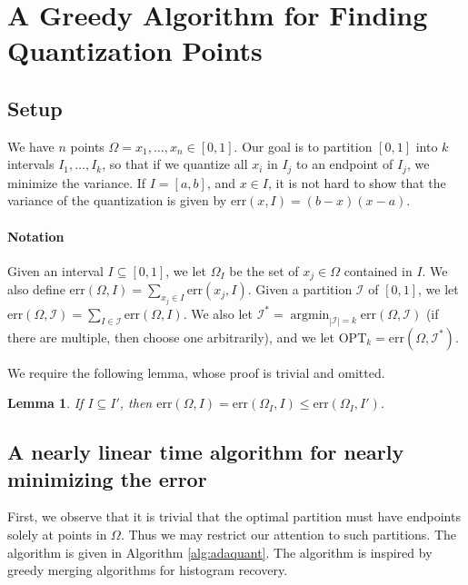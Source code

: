 \documentclass{article}
\newcommand{\err}{\ensuremath{\mathrm{err}}}
\newcommand{\setX}{\Omega}
\newcommand{\setI}{\mathcal{I}}
\newcommand{\OPT}{\ensuremath{\mathrm{OPT}}}
\DeclareMathOperator*{\argmin}{argmin}
\newtheorem{lemma}{Lemma}
\begin{document}
\section{A Greedy Algorithm for Finding Quantization Points}
\subsection{Setup}
We have $n$ points $\setX = x_1, \ldots, x_n \in [0, 1]$.
Our goal is to partition $[0, 1]$ into $k$ intervals $I_1, \ldots, I_k$, so that if we quantize all $x_i$ in $I_j$ to an endpoint of $I_j$, we minimize the variance.
If $I = [a, b]$, and $x \in I$, it is not hard to show that the variance of the quantization is given by $\err (x, I) = (b - x) (x - a)$.

\paragraph{Notation} Given an interval $I \subseteq [0, 1]$, we let $\setX_I$ be the set of $x_j \in \setX$ contained in $I$.
We also define $\err (\setX, I) = \sum_{x_j \in I} \err (x_j, I)$.
Given a partition $\setI$ of $[0, 1]$, we let $\err (\setX, \setI) = \sum_{I \in \setI} \err (\setX, I)$.
We also let $\setI^* = \argmin_{|\setI| = k} \err (\setX, \setI)$ (if there are multiple, then choose one arbitrarily), and we let $\OPT_k = \err(\setX, \setI^*)$.

We require the following lemma, whose proof is trivial and omitted.
\begin{lemma}
\label{lem:subset}
If $I \subseteq I'$, then $\err(\setX, I) = \err (\setX_I, I) \leq \err (\setX_I, I')$.
\end{lemma}

\subsection{A nearly linear time algorithm for nearly minimizing the error}
First, we observe that it is trivial that the optimal partition must have endpoints solely at points in $\setX$.
Thus we may restrict our attention to such partitions.
The algorithm is given in Algorithm \ref{alg:adaquant}.
The algorithm is inspired by  greedy merging algorithms for histogram recovery.
\end{document}
